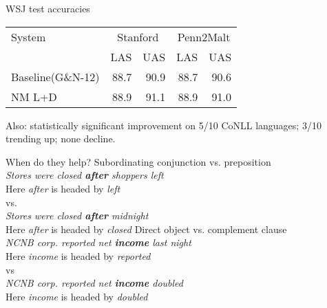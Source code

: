 \documentclass{lecture}
\begin{document}
\begin{plain}{WSJ test accuracies}
\begin{table}
    \centering
    \small
    \begin{tabular}{l|rr|rr}
        \hline 
System  &    \multicolumn{2}{c}{Stanford} & \multicolumn{2}{|c}{Penn2Malt} \\
                    &  LAS  & UAS  & LAS & UAS \\
        \hline \hline
Baseline(G\&N-12)   & 88.7 & 90.9 & 88.7  & 90.6 \\
NM L+D              & 88.9 & 91.1 & 88.9  & 91.0 \\
\hline
    \end{tabular}
\end{table}

Also: statistically significant improvement on 5/10 CoNLL languages; 3/10 trending up;
none decline.
\end{plain}


\begin{points}{When do they help?}
    \p Subordinating conjunction vs. preposition\\
    \emph{Stores were closed \textbf{after} shoppers left}\\
    Here \emph{after} is headed by \emph{left}\\
    vs.\\
    \emph{Stores were closed \textbf{after} midnight}\\
    Here \emph{after} is headed by \emph{closed}
    \p Direct object vs. complement clause\\
    \emph{NCNB corp. reported net \textbf{income} last night}\\
    Here \emph{income} is headed by \emph{reported}\\
    vs\\
    \emph{NCNB corp. reported net \textbf{income} doubled}\\
    Here \emph{income} is headed by \emph{doubled}\\
\end{points}
\end{document}
